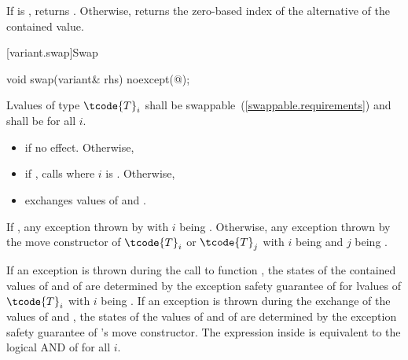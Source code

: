 \begin{itemdescr}
\pnum
\effects
If  is , returns .
Otherwise, returns the zero-based index of the alternative of the contained value.
\end{itemdescr}

[variant.swap]{Swap}

%
\begin{itemdecl}
void swap(variant& rhs) noexcept(@\seebelow@);
\end{itemdecl}

\begin{itemdescr}
\pnum
\requires Lvalues of type $\tcode{T}_i$ shall be swappable~(\ref{swappable.requirements}) and
 shall be  for all $i$.

\pnum
\effects
\begin{itemize}
\item
if  no effect. Otherwise,
\item
if , calls  where $i$ is . Otherwise,
\item
exchanges values of  and .
\end{itemize}

\pnum
\throws
If ,
any exception thrown by 
with $i$ being .
Otherwise, any exception thrown by the move constructor
of $\tcode{T}_i$ or $\tcode{T}_j$
with $i$ being  and $j$ being .

\pnum
\remarks
If an exception is thrown during the call to function ,
the states of the contained values of  and of  are
determined by the exception safety guarantee of  for lvalues of
$\tcode{T}_i$ with $i$ being .
If an exception is thrown during the exchange of the values of 
and , the states of the values of  and of 
are determined by the exception safety guarantee of 's move constructor.
The expression inside  is equivalent to the logical AND of
 for all $i$.
\end{itemdescr}

